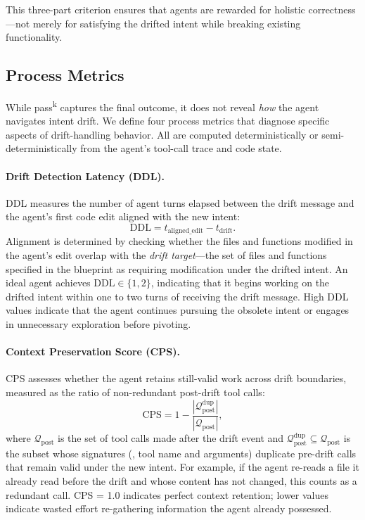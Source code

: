 \noindent This three-part criterion ensures that agents are rewarded for holistic correctness---not merely for satisfying the drifted intent while breaking existing functionality.

\subsection{Process Metrics}
\label{sec:process-metrics}

While pass\textsuperscript{k} captures the final outcome, it does not reveal \emph{how} the agent navigates intent drift. We define four process metrics that diagnose specific aspects of drift-handling behavior. All are computed deterministically or semi-deterministically from the agent's tool-call trace and code state.

\paragraph{Drift Detection Latency (DDL).}
DDL measures the number of agent turns elapsed between the drift message and the agent's first code edit aligned with the new intent:
\begin{equation}
\label{eq:ddl}
\text{DDL} = t_{\text{aligned\_edit}} - t_{\text{drift}}.
\end{equation}
Alignment is determined by checking whether the files and functions modified in the agent's edit overlap with the \emph{drift target}---the set of files and functions specified in the blueprint as requiring modification under the drifted intent. An ideal agent achieves $\text{DDL} \in \{1, 2\}$, indicating that it begins working on the drifted intent within one to two turns of receiving the drift message. High DDL values indicate that the agent continues pursuing the obsolete intent or engages in unnecessary exploration before pivoting.

\paragraph{Context Preservation Score (CPS).}
CPS assesses whether the agent retains still-valid work across drift boundaries, measured as the ratio of non-redundant post-drift tool calls:
\begin{equation}
\label{eq:cps}
\text{CPS} = 1 - \frac{|\mathcal{Q}_{\text{post}}^{\text{dup}}|}{|\mathcal{Q}_{\text{post}}|},
\end{equation}
where $\mathcal{Q}_{\text{post}}$ is the set of tool calls made after the drift event and $\mathcal{Q}_{\text{post}}^{\text{dup}} \subseteq \mathcal{Q}_{\text{post}}$ is the subset whose signatures (\ie, tool name and arguments) duplicate pre-drift calls that remain valid under the new intent. For example, if the agent re-reads a file it already read before the drift and whose content has not changed, this counts as a redundant call. CPS = 1.0 indicates perfect context retention; lower values indicate wasted effort re-gathering information the agent already possessed.

